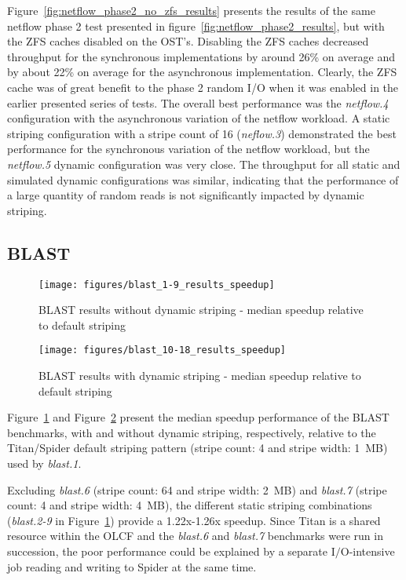 \documentclass[conference,compsoc]{IEEEtran}
\begin{document}
Figure~\ref{fig:netflow_phase2_no_zfs_results} presents the results of the same netflow phase 2 test presented in figure~\ref{fig:netflow_phase2_results}, but with the ZFS caches disabled on the OST's. Disabling the ZFS caches decreased throughput for the synchronous implementations by around 26\% on average and by about 22\% on average for the asynchronous implementation. Clearly, the ZFS cache was of great benefit to the phase 2 random I/O when it was enabled in the earlier presented series of tests. The overall best performance was the \emph{netflow.4} configuration with the asynchronous variation of the netflow workload. A static striping configuration with a stripe count of 16 (\emph{neflow.3}) demonstrated the best performance for the synchronous variation of the netflow workload, but the \emph{netflow.5} dynamic configuration was very close. The throughput for all static and simulated dynamic configurations was similar, indicating that the performance of a large quantity of random reads is not significantly impacted by dynamic striping.

\subsection{BLAST}

\begin{figure}[t]
\centering
  \texttt{[image: figures/blast\_1-9\_results\_speedup]}
\caption{BLAST results without dynamic striping - median speedup relative to default striping}
\label{fig:blast_1-9_results}
\end{figure}

\begin{figure}[t]
\centering
  \texttt{[image: figures/blast\_10-18\_results\_speedup]}
\caption{BLAST results with dynamic striping - median speedup relative to default striping}
\label{fig:blast_10-18_results}
\end{figure}

Figure~\ref{fig:blast_1-9_results} and Figure~\ref{fig:blast_10-18_results} present the median speedup performance of the BLAST benchmarks, with and without dynamic striping, respectively, relative to the Titan/Spider default striping pattern (stripe count: 4 and stripe width: 1~MB) used by \emph{blast.1}. 

Excluding \emph{blast.6} (stripe count: 64 and stripe width: 2~MB) and \emph{blast.7} (stripe count: 4 and stripe width: 4~MB), the different static striping combinations (\emph{blast.2-9} in Figure~\ref{fig:blast_1-9_results}) provide a 1.22x-1.26x speedup. Since Titan is a shared resource within the OLCF and the \emph{blast.6} and \emph{blast.7} benchmarks were run in succession, the poor performance could be explained by a separate I$/$O-intensive job reading and writing to Spider at the same time.
\end{document}
